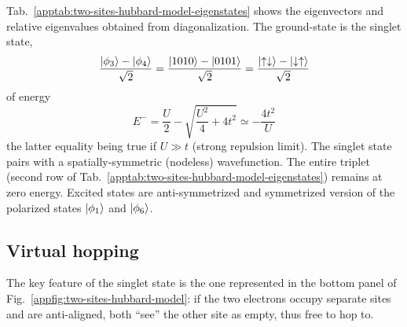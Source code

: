 Tab.~\ref{apptab:two-sites-hubbard-model-eigenstates} shows the eigenvectors and relative eigenvalues obtained from diagonalization. The ground-state is the singlet state,
\[
	\frac{\ket{\phi_3} - \ket{\phi_4}}{\sqrt{2}} = \frac{\ket{1010} - \ket{0101}}{\sqrt{2}} = \frac{\ket{\uparrow\downarrow} - \ket{\downarrow\uparrow}}{\sqrt{2}}
\]
of energy
\[
	E^- = \frac{U}{2} - \sqrt{\frac{U^2}{4} + 4t^2} \simeq - \frac{4t^2}{U}
\]
the latter equality being true if $U \gg t$ (strong repulsion limit). The singlet state pairs with a spatially-symmetric (nodeless) wavefunction. The entire triplet (second row of Tab.~\ref{apptab:two-sites-hubbard-model-eigenstates}) remains at zero energy. Excited states are anti-symmetrized and symmetrized version of the polarized states $\ket{\phi_1}$ and $\ket{\phi_6}$.

\subsection{Virtual hopping}

The key feature of the singlet state is the one represented in the bottom panel of Fig.~\ref{appfig:two-sites-hubbard-model}: if the two electrons occupy separate sites and are anti-aligned, both ``see'' the other site as empty, thus free to hop to. \todo